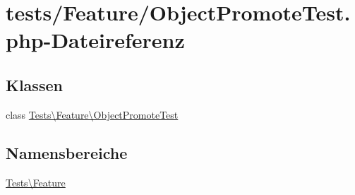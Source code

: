 \hypertarget{ObjectPromoteTest_8php}{}\section{tests/\+Feature/\+Object\+Promote\+Test.php-\/\+Dateireferenz}
\label{ObjectPromoteTest_8php}
\subsection*{Klassen}
\begin{DoxyCompactItemize}
\item 
class \hyperlink{classTests_1_1Feature_1_1ObjectPromoteTest}{Tests\textbackslash{}\+Feature\textbackslash{}\+Object\+Promote\+Test}
\end{DoxyCompactItemize}
\subsection*{Namensbereiche}
\begin{DoxyCompactItemize}
\item 
 \hyperlink{namespaceTests_1_1Feature}{Tests\textbackslash{}\+Feature}
\end{DoxyCompactItemize}
